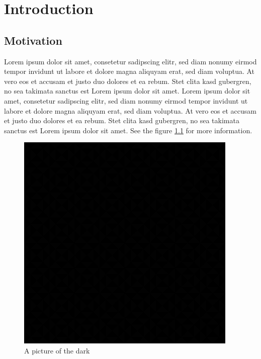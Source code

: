 \chapter{Introduction}
\section{Motivation}
Lorem ipsum dolor sit amet, consetetur sadipscing elitr, sed diam nonumy eirmod tempor invidunt ut labore et dolore magna aliquyam erat, sed diam voluptua. At vero eos et accusam et justo duo dolores et ea rebum. Stet clita kasd gubergren, no sea takimata sanctus est Lorem ipsum dolor sit amet. Lorem ipsum dolor sit amet, consetetur sadipscing elitr, sed diam nonumy eirmod tempor invidunt ut labore et dolore magna aliquyam erat, sed diam voluptua. At vero eos et accusam et justo duo dolores et ea rebum. Stet clita kasd gubergren, no sea takimata sanctus est Lorem ipsum dolor sit amet. See the figure \ref{fig:DarkPicture} for more information.

\begin{figure}[htbp]
\centering
\includegraphics[scale=0.8]{img/image.png}
\caption{A picture of the dark}
\label{fig:DarkPicture}
\end{figure}